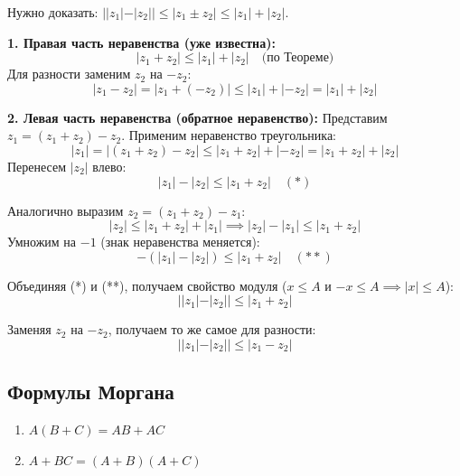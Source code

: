 \begin{tcolorbox}[title=Доказательство следствия]
	Нужно доказать: $||z_1| - |z_2|| \le |z_1 \pm z_2| \le |z_1| + |z_2|$.
	
	\textbf{1. Правая часть неравенства (уже известна):}
	\[ |z_1 + z_2| \le |z_1| + |z_2| \quad \text{(по Теореме)} \]
	Для разности заменим $z_2$ на $-z_2$:
	\[ |z_1 - z_2| = |z_1 + (-z_2)| \le |z_1| + |-z_2| = |z_1| + |z_2| \]
	
	\textbf{2. Левая часть неравенства (обратное неравенство):}
	Представим $z_1 = (z_1 + z_2) - z_2$. Применим неравенство треугольника:
	\[ |z_1| = |(z_1 + z_2) - z_2| \le |z_1 + z_2| + |-z_2| = |z_1 + z_2| + |z_2| \]
	Перенесем $|z_2|$ влево:
	\[ |z_1| - |z_2| \le |z_1 + z_2| \quad (*) \]
	
	Аналогично выразим $z_2 = (z_1 + z_2) - z_1$:
	\[ |z_2| \le |z_1 + z_2| + |z_1| \implies |z_2| - |z_1| \le |z_1 + z_2| \]
	Умножим на $-1$ (знак неравенства меняется):
	\[ -(|z_1| - |z_2|) \le |z_1 + z_2| \quad (**) \]
	
	Объединяя (*) и (**), получаем свойство модуля ($x \le A$ и $-x \le A \implies |x| \le A$):
	\[ ||z_1| - |z_2|| \le |z_1 + z_2| \]
	
	Заменяя $z_2$ на $-z_2$, получаем то же самое для разности:
	\[ ||z_1| - |z_2|| \le |z_1 - z_2| \]
\end{tcolorbox}

\subsection{Формулы Моргана}
\begin{enumerate}
	\item $A(B+C) = AB + AC$
	\item $A + BC = (A + B)(A + C)$
\end{enumerate}

